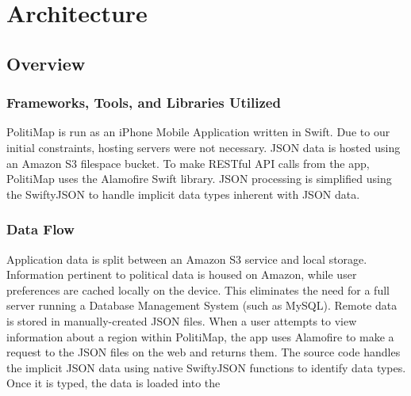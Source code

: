 \section{Architecture}
% 
\subsection{Overview}
\subsubsection{Frameworks, Tools, and Libraries Utilized}
PolitiMap is run as an iPhone Mobile Application written in Swift. Due
to our initial constraints, hosting servers were not necessary. JSON data
is hosted using an Amazon S3 filespace bucket. To make RESTful API calls
from the app, PolitiMap uses the Alamofire Swift library. JSON processing
is simplified using the SwiftyJSON to handle implicit data types inherent
with JSON data.
\subsubsection{Data Flow}
Application data is split between an Amazon S3 service and local storage.
Information pertinent to political data is housed on Amazon, while user
preferences are cached locally on the device. This eliminates the need for
a full server running a Database Management System (such as MySQL). Remote
data is stored in manually-created JSON files. When a user attempts to view
information about a region within PolitiMap, the app uses Alamofire
to make a request to the JSON files on the web and returns them. The source
code handles the implicit JSON data using native SwiftyJSON functions to
identify data types. Once it is typed, the data is loaded into the 

